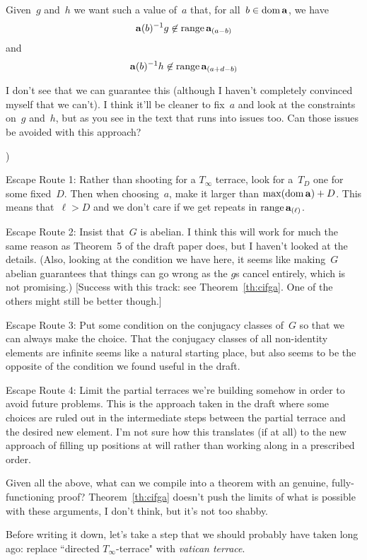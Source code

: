 \documentclass[a4paper,12pt]{article}
\newcommand{\dom}{\mathop{\rm dom}\nolimits}
\newcommand{\range}{\mathop{\rm range}\nolimits}
\begin{document}
\begin{enumerate}
{Given~$g$ and~$h$ we want such a value of~$a$ that, for all~$b \in \dom{{\bf a}}$, we have $${\bf a}(b)^{-1}g \not\in \range{{\bf a}_{(a-b)}}$$ and $${\bf a}(b)^{-1}h \not\in \range{{\bf a}_{(a+d-b)}}$$

I don't see that we can guarantee this (although I haven't completely convinced myself that we can't).  I think it'll be cleaner to fix~$a$ and look at the constraints on~$g$ and~$h$, but as you see in the text that runs into issues too. Can those issues be avoided with this approach?})

Escape Route 1: Rather than shooting for a $T_{\infty}$ terrace, look for a~$T_D$ one for some fixed~$D$.  Then when choosing~$a$, make it larger than $\max(\dom{{\bf a}}) + D$.  This means that~$\ell > D$ and we don't care if we get repeats in $\range{{\bf a}_{(\ell)}}$.

Escape Route 2:  Insist that~$G$ is abelian.  I think this will work for much the same reason as Theorem~5 of the draft paper does, but I haven't looked at the details.  (Also, looking at the condition we have here, it seems like making~$G$ abelian guarantees that things can go wrong as the $g$s cancel entirely, which is not promising.)  [Success with this track: see Theorem~\ref{th:cifga}.  One of the others might still be better though.]

Escape Route 3: Put some condition on the conjugacy classes of~$G$ so that we can always make the choice.  That the conjugacy classes of all non-identity elements are infinite seems like a natural starting place, but also seems to be the opposite of the condition we found useful in the draft.

Escape Route 4: Limit the partial terraces we're building somehow in order to avoid future problems.  This is the approach taken in the draft where some choices are ruled out in the intermediate steps between the partial terrace and the desired new element.   I'm not sure how this translates (if at all) to the new approach of filling up positions at will rather than working along in a prescribed order.
\end{enumerate}

\vspace{5mm}

Given all the above, what can we compile into a theorem with an genuine, fully-functioning proof?  Theorem~\ref{th:cifga} doesn't push the limits of what is possible with these arguments, I don't think, but it's not too shabby.

Before writing it down, let's take a step that we should probably have taken long ago: replace ``directed $T_{\infty}$-terrace" with {\em vatican terrace}.
\end{document}
